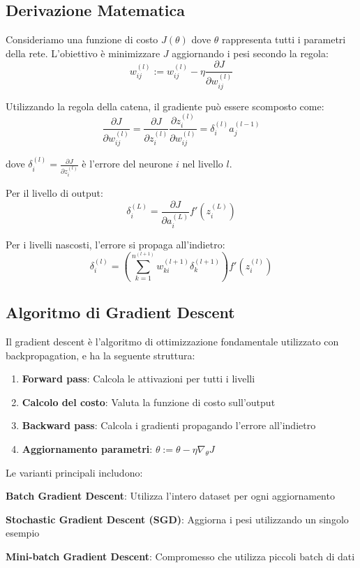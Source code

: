 \subsection{Derivazione Matematica}
Consideriamo una funzione di costo $J(\theta)$ dove $\theta$ rappresenta tutti i parametri della rete. L'obiettivo è minimizzare $J$ aggiornando i pesi secondo la regola:
\[
w_{ij}^{(l)} := w_{ij}^{(l)} - \eta \frac{\partial J}{\partial w_{ij}^{(l)}}
\]

Utilizzando la regola della catena, il gradiente può essere scomposto come:
\[
\frac{\partial J}{\partial w_{ij}^{(l)}} = \frac{\partial J}{\partial z_i^{(l)}} \frac{\partial z_i^{(l)}}{\partial w_{ij}^{(l)}} = \delta_i^{(l)} a_j^{(l-1)}
\]

dove $\delta_i^{(l)} = \frac{\partial J}{\partial z_i^{(l)}}$ è l'errore del neurone $i$ nel livello $l$.

Per il livello di output:
\[
\delta_i^{(L)} = \frac{\partial J}{\partial a_i^{(L)}} f'(z_i^{(L)})
\]

Per i livelli nascosti, l'errore si propaga all'indietro:
\[
\delta_i^{(l)} = \left(\sum_{k=1}^{n^{(l+1)}} w_{ki}^{(l+1)} \delta_k^{(l+1)}\right) f'(z_i^{(l)})
\]

\subsection{Algoritmo di Gradient Descent}
Il gradient descent è l'algoritmo di ottimizzazione fondamentale utilizzato con backpropagation, e ha la seguente struttura:
\begin{enumerate}
\item \textbf{Forward pass}: Calcola le attivazioni per tutti i livelli
\item \textbf{Calcolo del costo}: Valuta la funzione di costo sull'output
\item \textbf{Backward pass}: Calcola i gradienti propagando l'errore all'indietro
\item \textbf{Aggiornamento parametri}: $\theta := \theta - \eta \nabla_\theta J$
\end{enumerate}
Le varianti principali includono:
\begin{compactitemize}
\item \textbf{Batch Gradient Descent}: Utilizza l'intero dataset per ogni aggiornamento
\item \textbf{Stochastic Gradient Descent (SGD)}: Aggiorna i pesi utilizzando un singolo esempio
\item \textbf{Mini-batch Gradient Descent}: Compromesso che utilizza piccoli batch di dati
\end{compactitemize}

